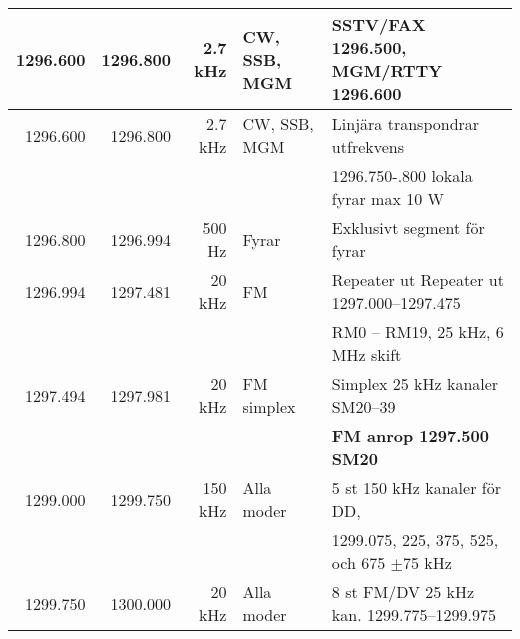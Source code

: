 \begin{tabular}{rrrll}
	1296.600         & 1296.800      & 2.7 kHz     & CW, SSB, MGM    & SSTV/FAX 1296.500, MGM/RTTY 1296.600                         \\ \hline
	1296.600         & 1296.800      & 2.7 kHz     & CW, SSB, MGM    & Linjära transpondrar utfrekvens                              \\
	&               &             &                 & 1296.750-.800 lokala fyrar max 10 W                          \\ \hline
	1296.800         & 1296.994      & 500 Hz      & Fyrar           & Exklusivt segment för fyrar                                  \\ \hline
	1296.994         & 1297.481      & 20 kHz      & FM              & Repeater ut Repeater ut 1297.000--1297.475                   \\
	&               &             &                 & RM0 – RM19, 25 kHz, 6 MHz skift                              \\ \hline
	1297.494         & 1297.981      & 20 kHz      & FM simplex      & Simplex 25 kHz kanaler SM20--39                              \\
	&               &             &                 & \textbf{FM anrop 1297.500 SM20}                              \\ \hline
	1299.000         & 1299.750      & 150 kHz     & Alla moder      & 5 st 150 kHz kanaler för DD,                                 \\
	&               &             &                 & 1299.075, 225, 375, 525, och 675 $\pm$75 kHz                 \\ \hline
	1299.750         & 1300.000      & 20 kHz      & Alla moder      & 8 st FM/DV 25 kHz kan. 1299.775--1299.975
\end{tabular}

\clearpage

\twocolumn
